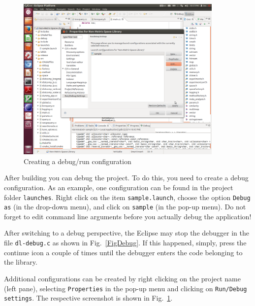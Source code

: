 \documentclass[runningheads,a4paper]{llncs}
\newcommand{\ttt}[1]{\texttt{#1}}
\begin{document}
{\begin{figure}
\centering
\caption{\label{FigDebugConf}Creating a debug/run configuration}
\includegraphics[width=0.9\textwidth]{figures/EclipseDebugConf.pdf}
\end{figure}

After building you can debug the project.
To do this, you need to create a debug configuration.
As an example, one configuration can be found in the 
project folder \ttt{launches}.
Right click on the item \ttt{sample.launch},
choose the option \ttt{Debug as} (in the drop-down menu),
and click on \ttt{sample} (in the pop-up menu).
Do not forget to edit command line arguments before you actually debug the application!

After switching to a debug perspective,
the Eclipse may stop the debugger in 
the file \ttt{dl-debug.c} as shown in Fig.~\ref{FigDebug}.
If this happened, simply, press the continue icon a couple of
times until the debugger enters the code belonging to the library.

Additional configurations can be created by right clicking
on the project name (left pane), selecting \ttt{Properties}
in the pop-up menu and clicking on \ttt{Run/Debug settings}. 
The respective screenshot is shown in Fig.~\ref{FigDebugConf}.


}
\end{document}
